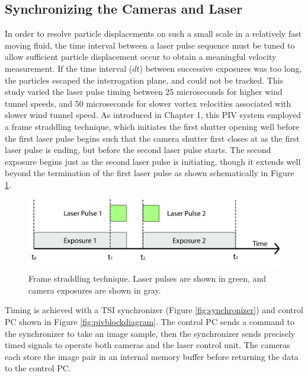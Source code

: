\subsection{Synchronizing the Cameras and Laser}
In order to resolve particle displacements on such a small scale in a 
relatively fast moving fluid, the time interval between a laser pulse sequence 
must be tuned to allow sufficient particle displacement occur to obtain a 
meaningful velocity measurement. If the time interval ($dt$) between successive 
exposures was too long, the particles escaped the interrogation plane, and 
could not be tracked. This study varied the laser pulse timing 
between 25 microseconds for higher wind tunnel speeds, and 50 microseconds for 
slower vortex velocities associated with slower wind tunnel speed. As 
introduced in Chapter 1, this PIV system employed a frame straddling technique, 
which initiates the first shutter opening well before the first laser 
pulse begins such that the camera shutter first closes at as the first laser 
pulse is ending, but before the second laser pulse starts. The second exposure 
begins just as the second laser pulse is initiating, though it extends well 
beyond the termination of the first laser pulse as shown schematically in 
Figure \ref{fig:frame_straddling}. 

\begin{figure}
	\centering
	\includegraphics[width=5.5in]{figs/piv_method/frame_straddling}
	\caption{Frame straddling technique. Laser pulses are shown in green, and 
		camera exposures are shown in gray.}
	\label{fig:frame_straddling}
\end{figure}

Timing is achieved with a TSI synchronizer (Figure \ref{fig:synchronizer}) and 
control PC shown in Figure 
\ref{fig:pivblockdiagram}. The control PC sends a command to the synchronizer 
to take an image sample, then the synchronizer sends precisely timed signals to 
operate both cameras and the laser control unit. The cameras each store the 
image pair in an internal memory buffer before returning the data to the 
control PC.

